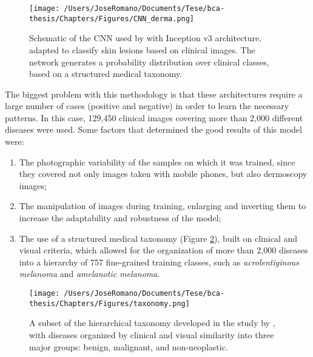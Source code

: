 \begin{figure}[htbp]
  \centering
  \texttt{[image: /Users/JoseRomano/Documents/Tese/bca-thesis/Chapters/Figures/CNN\_derma.png]}
  \caption{Schematic of the CNN used by \textcite{ai_in_dermacancer_esteva2017} with Inception v3 architecture, adapted to classify skin lesions based on clinical images. The network generates a probability distribution over clinical classes, based on a structured medical taxonomy.}
  \label{fig:CNN_derma}
\end{figure}

The biggest problem with this methodology is that these architectures require a
large number of cases (positive and negative) in order to learn the necessary
patterns. In this case, 129{,}450 clinical images covering more than 2{,}000
different diseases were used. Some factors that determined the good results of
this model were:

\begin{enumerate}
  \item The photographic variability of the samples on which it was trained, since they
        covered not only images taken with mobile phones, but also dermoscopy images;

  \item The manipulation of images during training, enlarging and inverting them to
        increase the adaptability and robustness of the model;

  \item The use of a structured medical taxonomy (Figure \ref{fig:taxonomy}), built on
        clinical and visual criteria, which allowed for the organization of more than
        2{,}000 diseases into a hierarchy of 757 fine-grained training classes, such as
        \textit{acrolentiginous melanoma} and \textit{amelanotic melanoma}.
\end{enumerate}

\begin{figure}[htbp]
  \centering
  \texttt{[image: /Users/JoseRomano/Documents/Tese/bca-thesis/Chapters/Figures/taxonomy.png]}
  \caption{A subset of the hierarchical taxonomy developed in the study by \textcite{ai_in_dermacancer_esteva2017}, with diseases organized by clinical and visual similarity into three major groups: benign, malignant, and non-neoplastic.}
  \label{fig:taxonomy}
\end{figure}

